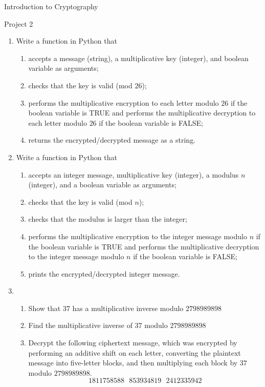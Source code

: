 \documentclass[12pt]{amsart}
\theoremstyle{definition}
\theoremstyle{remark}
\numberwithin{equation}{section}
\begin{document}
\begin{center}
Introduction to Cryptography

Project 2
\end{center}

\begin{enumerate}
\item Write a function in Python that 
\begin{enumerate}
\item accepts a message (string), a multiplicative key (integer), and boolean variable as arguments;
\item checks that the key is valid (mod $26$);
\item performs the multiplicative encryption to each letter modulo $26$ if the boolean variable is TRUE and performs the multiplicative decryption to each letter modulo $26$ if the boolean variable is FALSE;
\item returns the encrypted/decrypted message as a string.
\end{enumerate}

\item Write a function in Python that 
\begin{enumerate}
\item accepts an integer message, multiplicative key (integer), a modulus $n$ (integer), and a boolean variable as arguments;
\item checks that the key is valid (mod $n$);
\item checks that the modulus is larger than the  integer;
\item performs the multiplicative encryption to the integer message modulo $n$ if the boolean variable is TRUE and performs the multiplicative decryption to the integer message modulo $n$ if the boolean variable is FALSE;
\item prints the encrypted/decrypted integer message.
\end{enumerate}

\item
\begin{enumerate}
\item Show that $37$ has a multiplicative inverse modulo $2798989898$
\item Find the multiplicative inverse of $37$ modulo $2798989898$
\item Decrypt the following ciphertext message, which was encrypted by performing an additive shift on each letter, converting the plaintext message into five-letter blocks, and then multiplying each block by $37$ modulo $2798989898$. $$1811758588 \text{  } 853934819 \text{  } 2412335942$$
\end{enumerate}


\end{enumerate}
\end{document}
